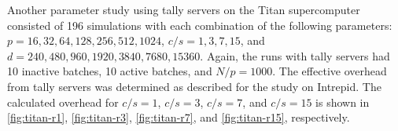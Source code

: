 Another parameter study using tally servers on the Titan supercomputer consisted
of 196 simulations with each combination of the following parameters: $p =
16,32,64,128,256,512,1024$, $c/s = 1,3,7,15$, and $d = 240, 480, 960, 1920,
3840, 7680, 15360$. Again, the runs with tally servers had 10 inactive batches,
10 active batches, and $N/p = 1000$. The effective overhead from tally servers
was determined as described for the study on Intrepid. The calculated overhead
for $c/s = 1$, $c/s = 3$, $c/s = 7$, and $c/s = 15$ is shown in
\autoref{fig:titan-r1}, \autoref{fig:titan-r3}, \autoref{fig:titan-r7}, and
\autoref{fig:titan-r15}, respectively.

\begin{figure}[!tbh]
\end{figure}

